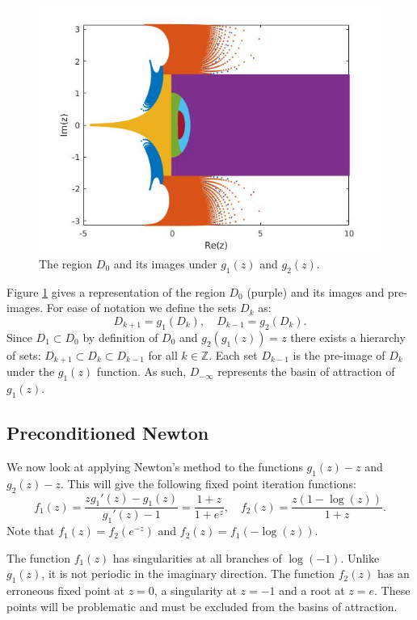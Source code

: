 \documentclass{book}
\begin{document}
\begin{figure}
	\includegraphics[width=\textwidth]{FPI_01.jpg}
	\caption{The region $D_0$ and its images under $g_1(z)$ and $g_2(z)$.}
	\label{fig:fpi01}
\end{figure}

Figure \ref{fig:fpi01} gives a representation of the region $D_0$ (purple) and its images and pre-images.
For ease of notation we define the sets $D_k$ as:
\begin{equation*}
D_{k+1} = g_1(D_k), \quad D_{k-1} = g_2(D_k).
\end{equation*}
Since $D_1 \subset D_0$ by definition of $D_0$ and $g_2(g_1(z)) = z$ there exists a hierarchy of sets:
$D_{k+1} \subset D_k \subset D_{k-1}$ for all $k \in \mathbb{Z}$.
Each set $D_{k-1}$ is the pre-image of $D_k$ under the $g_1(z)$ function.
As such, $D_{-\infty}$ represents the basin of attraction of $g_1(z)$.

\subsection{Preconditioned Newton}

We now look at applying Newton's method to the functions $g_1(z) - z$ and $g_2(z) - z$.
This will give the following fixed point iteration functions:
\begin{equation} \label{eq:Newton}
f_1(z) = \frac{z g_1'(z) - g_1(z)}{g_1'(z) - 1} = \frac{1 + z}{1 + e^z}, \quad f_2(z) = \frac{z ( 1 - \log(z) )}{1 + z} .
\end{equation}
Note that $f_1(z) = f_2(e^{-z})$ and $f_2(z) = f_1(-\log(z))$.

The function $f_1(z)$ has singularities at all branches of $\log(-1)$.
Unlike $g_1(z)$, it is not periodic in the imaginary direction.
The function $f_2(z)$ has an erroneous fixed point at $z=0$, a singularity at $z=-1$ and a root at $z = e$.
These points will be problematic and must be excluded from the basins of attraction.
\end{document}
